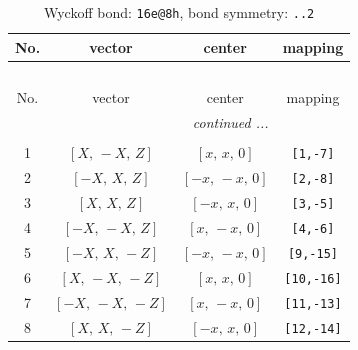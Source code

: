 \documentclass[fleqn,8pt]{jsarticle}
\begin{document}
\begin{longtable}{cccc}
\caption{Wyckoff bond: {\tt 16e@8h}, bond symmetry: {\tt ..2}}
 \\
 \hline \hline
No. & vector & center & mapping \\ \hline \endfirsthead

\multicolumn{3}{l}{\tablename\ \thetable{}} \\
 \hline \hline
No. & vector & center & mapping \\ \hline \endhead

 \hline \hline
\multicolumn{3}{r}{\footnotesize\it continued ...} \\ \endfoot

 \hline \hline
\multicolumn{3}{r}{} \\ \endlastfoot

1 & $\left[ X,\, - X,\, Z \right]$ & $\left[ x,\, x,\, 0 \right]$ & {\tt [1,-7]} \\ \hline
2 & $\left[ - X,\, X,\, Z \right]$ & $\left[ - x,\, - x,\, 0 \right]$ & {\tt [2,-8]} \\ \hline
3 & $\left[ X,\, X,\, Z \right]$ & $\left[ - x,\, x,\, 0 \right]$ & {\tt [3,-5]} \\ \hline
4 & $\left[ - X,\, - X,\, Z \right]$ & $\left[ x,\, - x,\, 0 \right]$ & {\tt [4,-6]} \\ \hline
5 & $\left[ - X,\, X,\, - Z \right]$ & $\left[ - x,\, - x,\, 0 \right]$ & {\tt [9,-15]} \\ \hline
6 & $\left[ X,\, - X,\, - Z \right]$ & $\left[ x,\, x,\, 0 \right]$ & {\tt [10,-16]} \\ \hline
7 & $\left[ - X,\, - X,\, - Z \right]$ & $\left[ x,\, - x,\, 0 \right]$ & {\tt [11,-13]} \\ \hline
8 & $\left[ X,\, X,\, - Z \right]$ & $\left[ - x,\, x,\, 0 \right]$ & {\tt [12,-14]} \\
\end{longtable}
\renewcommand{\arraystretch}{1.2}
\end{document}
